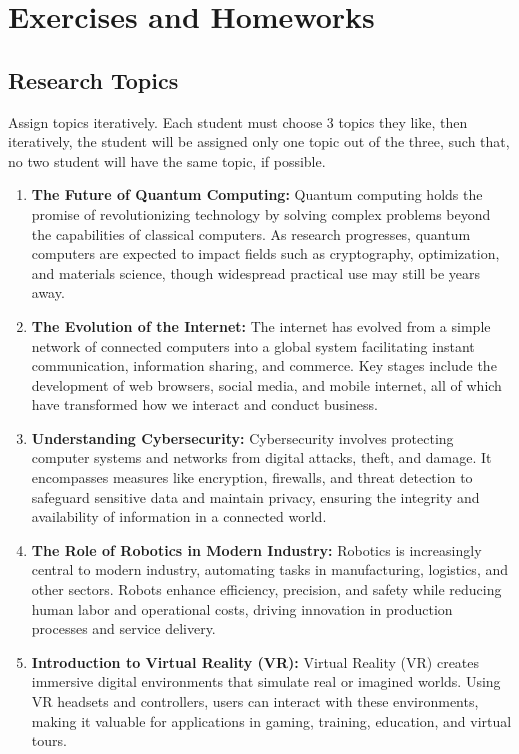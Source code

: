\section{Exercises and Homeworks}

\subsection*{Research Topics}
Assign topics iteratively. Each student must choose 3 topics they like, then iteratively, the student will be assigned only one topic out of the three, such that, no two student will have the same topic, if possible.
\begin{enumerate}
    \item \textbf{The Future of Quantum Computing:} Quantum computing holds the promise of revolutionizing technology by solving complex problems beyond the capabilities of classical computers. As research progresses, quantum computers are expected to impact fields such as cryptography, optimization, and materials science, though widespread practical use may still be years away.
    \item \textbf{The Evolution of the Internet:} The internet has evolved from a simple network of connected computers into a global system facilitating instant communication, information sharing, and commerce. Key stages include the development of web browsers, social media, and mobile internet, all of which have transformed how we interact and conduct business.
    \item \textbf{Understanding Cybersecurity:} Cybersecurity involves protecting computer systems and networks from digital attacks, theft, and damage. It encompasses measures like encryption, firewalls, and threat detection to safeguard sensitive data and maintain privacy, ensuring the integrity and availability of information in a connected world.
    \item \textbf{The Role of Robotics in Modern Industry:} Robotics is increasingly central to modern industry, automating tasks in manufacturing, logistics, and other sectors. Robots enhance efficiency, precision, and safety while reducing human labor and operational costs, driving innovation in production processes and service delivery.
    \item \textbf{Introduction to Virtual Reality (VR):} Virtual Reality (VR) creates immersive digital environments that simulate real or imagined worlds. Using VR headsets and controllers, users can interact with these environments, making it valuable for applications in gaming, training, education, and virtual tours.

\end{enumerate}
